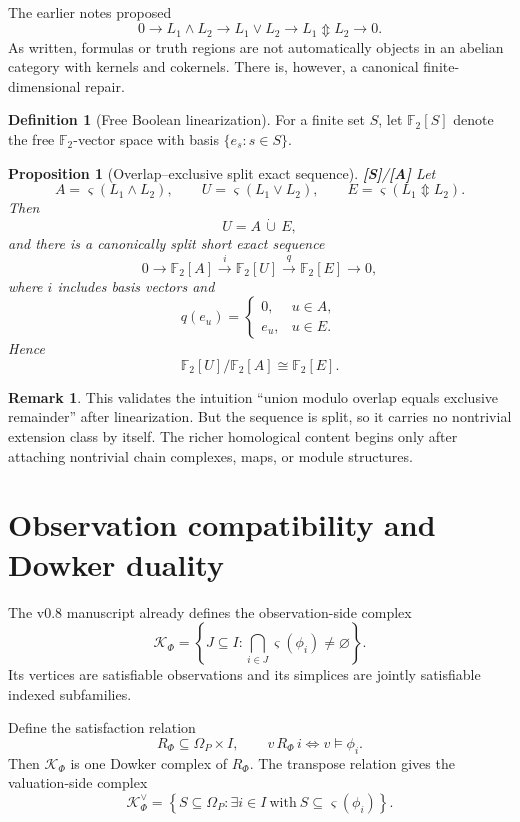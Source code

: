 \documentclass[11pt]{article}
\newtheorem{proposition}[theorem]{Proposition}
\theoremstyle{definition}
\newtheorem{definition}[theorem]{Definition}
\newtheorem{remark}[theorem]{Remark}
\newcommand{\F}{\mathbb F_2}
\newcommand{\Om}{\Omega_P}
\newcommand{\truth}{\varsigma}
\newcommand{\K}{\mathcal K}
\newcommand{\xor}{\mathbin{\Updownarrow}}
\newcommand{\statusS}{\textbf{[S]}}
\newcommand{\statusA}{\textbf{[A]}}
\begin{document}
The earlier notes proposed
\[
0\to L_1\wedge L_2\to L_1\vee L_2\to L_1\xor L_2\to0.
\]
As written, formulas or truth regions are not automatically objects in an abelian category with kernels and cokernels. There is, however, a canonical finite-dimensional repair.

\begin{definition}[Free Boolean linearization]
For a finite set $S$, let $\F[S]$ denote the free $\F$-vector space with basis $\{e_s:s\in S\}$.
\end{definition}

\begin{proposition}[Overlap--exclusive split exact sequence]\label{prop:linearized}
\statusS/\statusA\;
Let
\[
A=\truth(L_1\wedge L_2),\qquad
U=\truth(L_1\vee L_2),\qquad
E=\truth(L_1\xor L_2).
\]
Then
\[
U=A\,\dot\cup\,E,
\]
and there is a canonically split short exact sequence
\[
0\longrightarrow\F[A]
\overset{i}{\longrightarrow}\F[U]
\overset{q}{\longrightarrow}\F[E]
\longrightarrow0,
\]
where $i$ includes basis vectors and
\[
q(e_u)=
\begin{cases}
0,&u\in A,\\
e_u,&u\in E.
\end{cases}
\]
Hence
\[
\F[U]/\F[A]\cong\F[E].
\]
\end{proposition}

\begin{remark}
This validates the intuition ``union modulo overlap equals exclusive remainder'' after linearization. But the sequence is split, so it carries no nontrivial extension class by itself. The richer homological content begins only after attaching nontrivial chain complexes, maps, or module structures.
\end{remark}

\section{Observation compatibility and Dowker duality}

The v0.8 manuscript already defines the observation-side complex
\[
\K_\Phi
=\left\{J\subseteq I:
\bigcap_{i\in J}\truth(\phi_i)\neq\varnothing\right\}.
\]
Its vertices are satisfiable observations and its simplices are jointly satisfiable indexed subfamilies.

Define the satisfaction relation
\[
R_\Phi\subseteq\Om\times I,
\qquad
v\,R_\Phi\,i\iff v\models\phi_i.
\]
Then $\K_\Phi$ is one Dowker complex of $R_\Phi$. The transpose relation gives the valuation-side complex
\[
\K_\Phi^{\vee}
=\left\{S\subseteq\Om:\exists i\in I\ \text{with}\ S\subseteq\truth(\phi_i)\right\}.
\]
\end{document}
